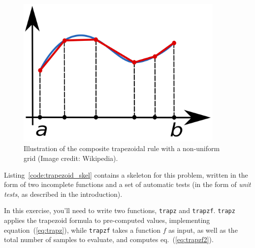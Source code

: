 %
\begin{figure}
\begin{centering}\includegraphics[width=4in]{fig/Composite_trapezoidal_rule_illustration}\par\end{centering}


\caption{\label{fig:trapezoid}Illustration of the composite trapezoidal rule
with a non-uniform grid (Image credit: Wikipedia).}
\end{figure}


Listing~\ref{code:trapezoid_skel} contains a skeleton for this problem,
written in the form of two incomplete functions and a set of automatic
tests (in the form of \emph{unit tests}, as described in the introduction).



In this exercise, you'll need to write two functions, \texttt{trapz}
and \texttt{trapzf}. \texttt{trapz} applies the trapezoid formula
to pre-computed values, implementing equation~(\ref{eq:trapz}),
while \texttt{trapzf} takes a function $f$ as input, as well as the
total number of samples to evaluate, and computes eq.~(\ref{eq:trapzf2}).
